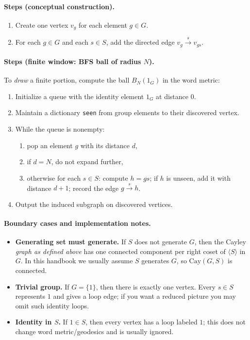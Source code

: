 \documentclass[11pt]{article}
\theoremstyle{definition}
\theoremstyle{plain}
\theoremstyle{remark}
\newcommand{\Cay}{\mathrm{Cay}}
\begin{document}
\paragraph{Steps (conceptual construction).}
\begin{enumerate}[leftmargin=2.2em]
\item Create one vertex $v_g$ for each element $g\in G$.
\item For each $g\in G$ and each $s\in S$, add the directed edge $v_g\xrightarrow{s}v_{gs}$.
\end{enumerate}

\paragraph{Steps (finite window: BFS ball of radius $N$).}
To \emph{draw} a finite portion, compute the ball $B_N(1_G)$ in the word metric:
\begin{enumerate}[leftmargin=2.2em]
\item Initialize a queue with the identity element $1_G$ at distance $0$.
\item Maintain a dictionary \texttt{seen} from group elements to their discovered vertex.
\item While the queue is nonempty:
\begin{enumerate}[leftmargin=2em]
\item pop an element $g$ with its distance $d$,
\item if $d=N$, do not expand further,
\item otherwise for each $s\in S$:
compute $h=gs$; if $h$ is unseen, add it with distance $d+1$; record the edge $g\xrightarrow{s}h$.
\end{enumerate}
\item Output the induced subgraph on discovered vertices.
\end{enumerate}


\paragraph{Boundary cases and implementation notes.}
\begin{itemize}[leftmargin=2em]
\item \textbf{Generating set must generate.} If $S$ does not generate $G$, then the Cayley \emph{graph as defined above} has one connected component per right coset of $\langle S\rangle$ in $G$. In this handbook we usually assume $S$ generates $G$, so $\Cay(G,S)$ is connected.
\item \textbf{Trivial group.} If $G=\{1\}$, then there is exactly one vertex. Every $s\in S$ represents $1$ and gives a loop edge; if you want a reduced picture you may omit such identity loops.
\item \textbf{Identity in $S$.} If $1\in S$, then every vertex has a loop labeled $1$; this does not change word metric/geodesics and is usually ignored.
\end{itemize}
\end{document}
